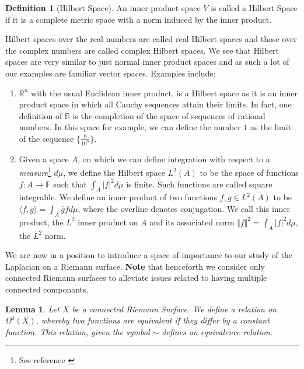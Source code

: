 \documentclass[11pt]{report}
\newtheorem{lemma}[thm]{Lemma}
\theoremstyle{definition}
\newtheorem{defn}[thm]{Definition}
\begin{document}
\begin{defn}[Hilbert Space]
  An inner product space $V$ is called a Hilbert Space if it is a complete metric space with a norm induced by the inner product.
\end{defn}
Hilbert spaces over the real numbers are called real Hilbert spaces and those over the complex numbers are called complex Hilbert spaces. We see that Hilbert spaces are very similar to just normal inner product spaces and as such a lot of our examples are familiar vector spaces. Examples include:
\begin{enumerate}
  \item $\mathbb{R}^n$ with the usual Euclidean inner product, is a Hilbert space as it is an inner product space in which all Cauchy sequences attain their limits. In fact, one definition of $\mathbb{R}$ is the completion of the space of sequences of rational numbers. In this space for example, we can define the number $1$ as the limit of the sequence $\{\frac{9}{10^n}\}$.
  \item Given a space $A$, on which we can define integration with respect to a \emph{measure}\footnote{See reference \cite[(Chapter 11)]{babyRudin}} $d\mu$, we define the Hilbert space $L^2(A)$ to be the space of functions $f: A \rightarrow \mathbb{F}$ such that $\int_A |f|^2 d\mu$ is finite. Such functions are called square integrable. We define an inner product of two functions $f,g \in L^2(A)$ to be $\langle f, g\rangle = \int_A \overline{g} f d\mu$, where the overline denotes conjugation. We call this inner product, the $L^2$ inner product on $A$ and its associated norm $\Vert f \Vert^2 = \int_A |f|^2 d\mu$, the $L^2$ norm.
\end{enumerate}

We are now in a position to introduce a space of importance to our study of the Laplacian on a Riemann surface. \textbf{Note} that henceforth we consider only connected Riemann surfaces to alleviate issues related to having multiple connected componants.

\begin{lemma}
  Let $X$ be a connected Riemann Surface. We define a relation on $\Omega^0(X)$, whereby two functions are equivalent if they differ by a constant function. This relation, given the symbol $\sim$ defines an equivalence relation.
\end{lemma}
\end{document}
